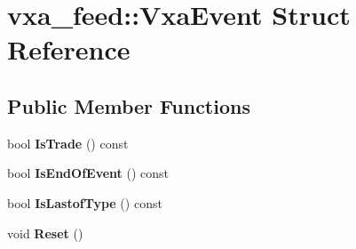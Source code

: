 \hypertarget{structvxa__feed_1_1_vxa_event}{}\section{vxa\+\_\+feed\+::Vxa\+Event Struct Reference}
\label{structvxa__feed_1_1_vxa_event}
\subsection*{Public Member Functions}
\begin{DoxyCompactItemize}
\item 
\mbox{\label{structvxa__feed_1_1_vxa_event_a77628eec82d5c8ce4899b39c353216be}} 
bool {\bfseries Is\+Trade} () const
\item 
\mbox{\label{structvxa__feed_1_1_vxa_event_a690be8bf079286bb8db2196ad3fc3fed}} 
bool {\bfseries Is\+End\+Of\+Event} () const
\item 
\mbox{\label{structvxa__feed_1_1_vxa_event_a4026c209ea110cce847a272898b48749}} 
bool {\bfseries Is\+Lastof\+Type} () const
\item 
\mbox{\label{structvxa__feed_1_1_vxa_event_ac8b34dd99332902b2addb06aee47e4df}} 
void {\bfseries Reset} ()
\end{DoxyCompactItemize}
